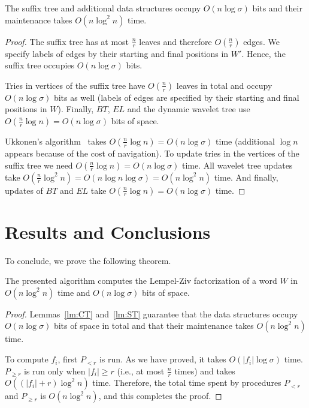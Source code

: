 \documentclass[10pt]{llncs}
\begin{document}
\begin{lemma}
\label{lm:ST}
The suffix tree and additional data structures occupy $O(n \log{\sigma})$ bits and their maintenance takes $O(n \log^2{n})$ time.
\end{lemma}
\begin{proof}
The suffix tree has at most $\frac{n}{r}$ leaves and therefore $O(\frac{n}{r})$ edges. We specify labels of edges by their starting and final positions in $W'$. Hence, the suffix tree occupies $O(n \log{\sigma})$ bits.

Tries in vertices of the suffix tree have $O(\frac{n}{r})$ leaves in total and occupy $O(n \log{\sigma})$ bits as well (labels of edges are specified by their starting and final positions in $W$). Finally, $BT$, $EL$ and the dynamic wavelet tree use $O(\frac{n}{r}\log{n}) = O(n \log\sigma)$ bits of space.

Ukkonen's algorithm~\cite{ukkonen:on-line} takes $O(\frac{n}{r}\log{n}) = O(n \log\sigma)$ time (additional $\log n$ appears because of the cost of navigation). To update tries in the vertices of the suffix tree we need $O(\frac{n}{r} \log n) = O(n\log\sigma)$ time. All wavelet tree updates take $O(\frac{n}{r} \log^2{n}) = O(n \log{n}\log\sigma) = O(n \log^2{n})$ time. And finally, updates of $BT$ and $EL$ take $O(\frac{n}{r}\log{n}) = O(n \log\sigma)$ time.
\end{proof}

\section{Results and Conclusions}
To conclude, we prove the following theorem. 

\begin{theorem}
  The presented algorithm computes the Lempel-Ziv factorization of a word $W$ in $O(n\log^2{n})$ time and $O(n \log{\sigma})$ bits of space.
\end{theorem}
\begin{proof}
Lemmas~\ref{lm:CT} and~\ref{lm:ST} guarantee that the data structures occupy $O(n\log{\sigma})$ bits of space in total and that their maintenance takes $O(n \log^2{n})$ time.

To compute $f_i$, first $P_{<r}$ is run. As we have proved, it takes $O(|f_i| \log \sigma)$ time. $P_{\geq r}$ is run only when $|f_i| \geq r$ (i.e., at most $\frac{n}{r}$ times) and takes $O((|f_i|+r)\log^2{n})$ time. Therefore, the total time spent by procedures $P_{<r}$ and $P_{\geq r}$ is $O(n \log^2 n)$, and this completes the proof.
\end{proof}
\end{document}
